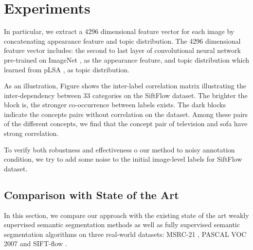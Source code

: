 \section{Experiments}
In particular, we extract a 4296 dimensional feature vector for each image by concatenating appearance feature and topic distribution. The 4296 dimensional feature vector includes: the second to last layer of convolutional neural network\cite{simonyan2014very} pre-trained on ImageNet \cite{russakovsky2014imagenet}, as the appearance feature, and topic distribution which learned from pLSA \cite{hofmann1999probabilistic}, as topic distribution.

As an illustration, Figure shows the inter-label correlation matrix illustrating the inter-dependency between 33 categories on the SiftFlow dataset. The brighter the block is, the stronger co-occurrence between labels exists. The dark blocks indicate the concepts pairs without correlation on the dataset.
Among these pairs of the different concepts, we find that the concept pair of television and sofa have strong correlation.

To verify both robustness and effectiveness o our method to noisy annotation condition, we try to add some noise to the initial image-level labels for SiftFlow dataset.


\subsection{Comparison with State of the Art}
In this section, we compare our approach with the existing state of the art weakly supervised semantic segmentation methods as well as fully supervised semantic segmentation algorithms on three real-world datasets: MSRC-21 \cite{shotton2006textonboost}, PASCAL VOC 2007 \cite{pascal-voc-2007} and SIFT-flow \cite{liu2011nonparametric}.

